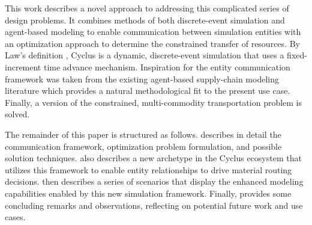 This work describes a novel approach to addressing this complicated series of
design problems. It combines methods of both discrete-event simulation and
agent-based modeling to enable communication between simulation entities with an
optimization approach to determine the constrained transfer of resources. By
Law's definition \cite{Law:1999:SMA:554952}, Cyclus is a dynamic, discrete-event
simulation that uses a fixed-increment time advance mechanism. Inspiration for
the entity communication framework was taken from the existing agent-based
supply-chain modeling literature
\cite{swaminathan_modeling_1998,julka_agent-based_2002,van_der_zee_modeling_2005,chatfield_multi-formalism_2007,holmgren_agent_2007}
which provides a natural methodological fit to the present use case. Finally, a
version of the constrained, multi-commodity transportation problem is solved.


The remainder of this paper is structured as follows. 
describes in detail the communication framework, optimization problem
formulation, and possible solution techniques.  also
describes a new archetype in the Cyclus ecosystem that utilizes this framework
to enable entity relationships to drive material routing
decisions.  then describes a series of scenarios that
display the enhanced modeling capabilities enabled by this new simulation
framework. Finally,  provides some concluding remarks and
observations, reflecting on potential future work and use cases.
